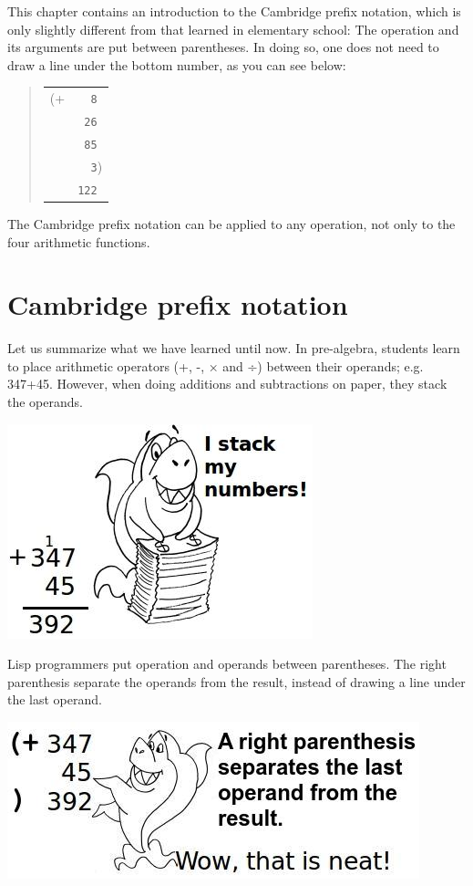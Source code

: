 \documentclass[a4paper,12pt]{book}
\begin{document}
This chapter contains an introduction to
the Cambridge prefix notation, 
which is only slightly different from that
learned in elementary school: The operation
and its arguments are put between parentheses.
In doing so, one does not need to draw a line
under the bottom number, as you can see below:
\begin{quote}
	\begin{tabular}{p{0.5cm}p{1cm}}
		(+ &\verb|  8|\\
		&\verb| 26|\\
		&\verb| 85|\\
		&\verb|  3|)\\
		&\verb|122|
	\end{tabular}
\end{quote}
The Cambridge prefix notation can be applied
to any operation, not only to the four arithmetic
functions. 

\section{Cambridge prefix notation}
Let us summarize what we have learned
until now. In pre-algebra, students
learn to place arithmetic operators (+, -, × and ÷)
between their operands; e.g. 347+45.
However, when doing additions and subtractions
on paper, they stack the operands.

\includegraphics{figs-prefix/stackshark.jpg}


Lisp programmers put operation and operands
between parentheses. The right parenthesis
separate the operands from the result,
instead of drawing a line under the last operand.

\includegraphics{figs-prefix/neatsum.jpg}
\end{document}
